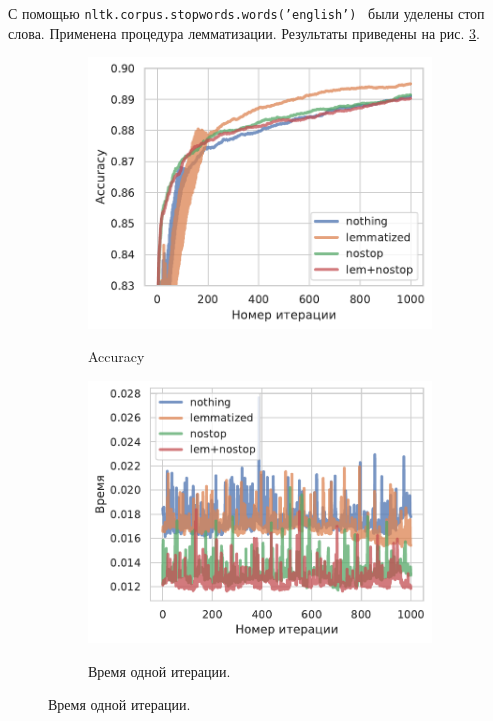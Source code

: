 \documentclass[12pt]{extarticle}
\begin{document}
С помощью {\texttt{nltk.corpus.stopwords.words('english')}~\cite{nltkstop}} были уделены стоп слова. Применена процедура лемматизации. Результаты приведены на рис. \ref{fig:nlp}. 

\begin{figure}[!htb]
     \caption{Результаты предобработки корпуса.}
     \centering
     \begin{subfigure}[t]{0.48\linewidth}
        \caption{Accuracy}
        \includegraphics[width=1\linewidth]{pics/nlp_stuff.pdf}
        \label{fig:nl_stuff}
     \end{subfigure}
     \begin{subfigure}[t]{0.5\linewidth}
        \centering
        \caption{Время одной итерации.}
        \includegraphics[width=1\linewidth]{pics/nlp_stuff_time.pdf}
        \label{fig:nl_stuff_time}
     \end{subfigure}
     \label{fig:nlp}
\end{figure}
\end{document}
